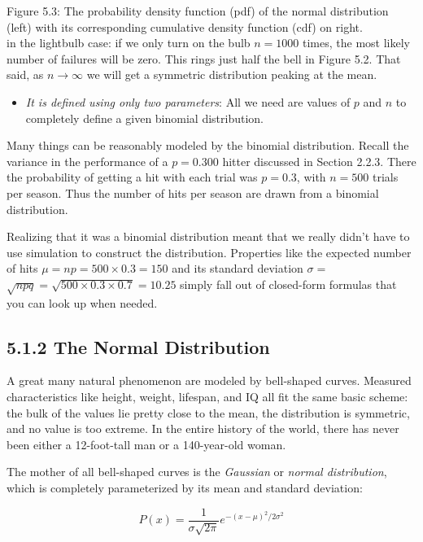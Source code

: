 \documentclass[10pt]{article}
\begin{document}
Figure 5.3: The probability density function (pdf) of the normal distribution (left) with its corresponding cumulative density function (cdf) on right.\\
in the lightbulb case: if we only turn on the bulb $n=1000$ times, the most likely number of failures will be zero. This rings just half the bell in Figure 5.2. That said, as $n \rightarrow \infty$ we will get a symmetric distribution peaking at the mean.

\begin{itemize}
  \item \emph{It is defined using only two parameters}: All we need are values of $p$ and $n$ to completely define a given binomial distribution.
\end{itemize}

Many things can be reasonably modeled by the binomial distribution. Recall the variance in the performance of a $p=0.300$ hitter discussed in Section 2.2.3. There the probability of getting a hit with each trial was $p=0.3$, with $n=500$ trials per season. Thus the number of hits per season are drawn from a binomial distribution.

Realizing that it was a binomial distribution meant that we really didn't have to use simulation to construct the distribution. Properties like the expected number of hits $\mu=n p=500 \times 0.3=150$ and its standard deviation $\sigma=$ $\sqrt{n p q}=\sqrt{500 \times 0.3 \times 0.7}=10.25$ simply fall out of closed-form formulas that you can look up when needed.

\subsection*{5.1.2 The Normal Distribution}
A great many natural phenomenon are modeled by bell-shaped curves. Measured characteristics like height, weight, lifespan, and IQ all fit the same basic scheme: the bulk of the values lie pretty close to the mean, the distribution is symmetric, and no value is too extreme. In the entire history of the world, there has never been either a 12-foot-tall man or a 140-year-old woman.

The mother of all bell-shaped curves is the \emph{Gaussian} or \emph{normal distribution}, which is completely parameterized by its mean and standard deviation:

\[
P(x)=\frac{1}{\sigma \sqrt{2 \pi}} e^{-(x-\mu)^{2} / 2 \sigma^{2}}
\]
\end{document}
